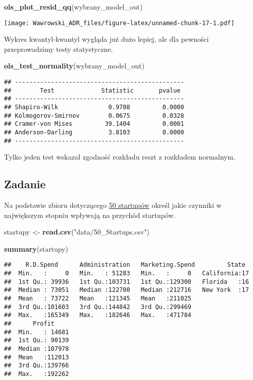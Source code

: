 \documentclass[]{book}
\newenvironment{Shaded}{\begin{snugshade}}{\end{snugshade}}
\newcommand{\KeywordTok}[1]{\textcolor[rgb]{0.13,0.29,0.53}{\textbf{#1}}}
\newcommand{\StringTok}[1]{\textcolor[rgb]{0.31,0.60,0.02}{#1}}
\newcommand{\NormalTok}[1]{#1}
\begin{document}
\begin{Shaded}
\begin{Highlighting}[]
\KeywordTok{ols_plot_resid_qq}\NormalTok{(wybrany_model_out)}
\end{Highlighting}
\end{Shaded}

\texttt{[image: Wawrowski\_ADR\_files/figure-latex/unnamed-chunk-17-1.pdf]}

Wykres kwantyl-kwantyl wygląda już dużo lepiej, ale dla pewności
przeprowadzimy testy statystyczne.

\begin{Shaded}
\begin{Highlighting}[]
\KeywordTok{ols_test_normality}\NormalTok{(wybrany_model_out)}
\end{Highlighting}
\end{Shaded}

\begin{verbatim}
## -----------------------------------------------
##        Test             Statistic       pvalue  
## -----------------------------------------------
## Shapiro-Wilk              0.9708         0.0000 
## Kolmogorov-Smirnov        0.0675         0.0328 
## Cramer-von Mises         39.1404         0.0001 
## Anderson-Darling          3.8103         0.0000 
## -----------------------------------------------
\end{verbatim}

Tylko jeden test wskazał zgodność rozkładu reszt z rozkładem normalnym.

\subsection{Zadanie}\label{zadanie-1}

Na podstawie zbioru dotyczącego \href{data/50_Startups.csv}{50
startupów} określ jakie czynniki w największym stopniu wpływają na
przychód startupów.

\begin{Shaded}
\begin{Highlighting}[]
\NormalTok{startupy <-}\StringTok{ }\KeywordTok{read.csv}\NormalTok{(}\StringTok{"data/50_Startups.csv"}\NormalTok{)}

\KeywordTok{summary}\NormalTok{(startupy)}
\end{Highlighting}
\end{Shaded}

\begin{verbatim}
##    R.D.Spend      Administration   Marketing.Spend         State   
##  Min.   :     0   Min.   : 51283   Min.   :     0   California:17  
##  1st Qu.: 39936   1st Qu.:103731   1st Qu.:129300   Florida   :16  
##  Median : 73051   Median :122700   Median :212716   New York  :17  
##  Mean   : 73722   Mean   :121345   Mean   :211025                  
##  3rd Qu.:101603   3rd Qu.:144842   3rd Qu.:299469                  
##  Max.   :165349   Max.   :182646   Max.   :471784                  
##      Profit      
##  Min.   : 14681  
##  1st Qu.: 90139  
##  Median :107978  
##  Mean   :112013  
##  3rd Qu.:139766  
##  Max.   :192262
\end{verbatim}
\end{document}
